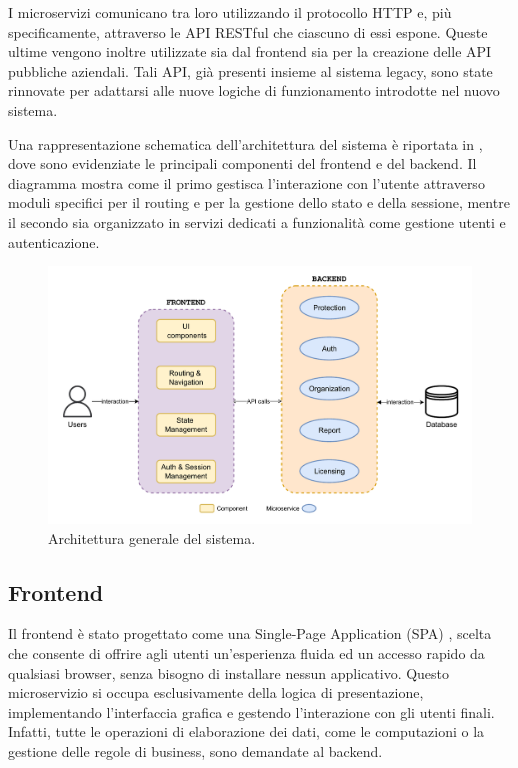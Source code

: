 I microservizi comunicano tra loro utilizzando il protocollo HTTP e, più specificamente, attraverso le API RESTful che ciascuno di essi espone. Queste ultime vengono inoltre utilizzate sia dal frontend sia per la creazione delle API pubbliche aziendali. Tali API, già presenti insieme al sistema legacy, sono state rinnovate per adattarsi alle nuove logiche di funzionamento introdotte nel nuovo sistema.

Una rappresentazione schematica dell'architettura del sistema è riportata in , dove sono evidenziate le principali componenti del frontend e del backend. Il diagramma mostra come il primo gestisca l'interazione con l'utente attraverso moduli specifici per il routing e per la gestione dello stato e della sessione, mentre il secondo sia organizzato in servizi dedicati a funzionalità come gestione utenti e autenticazione.

\begin{figure}
  \centering
  \includegraphics[width=1\textwidth]{figures/system-architecture.pdf}
  \caption{Architettura generale del sistema.}
  \label{fig:system-architecture}
\end{figure}

\subsection{Frontend}
Il frontend è stato progettato come una Single-Page Application (SPA) \cite{Fink2014}, scelta che consente di offrire agli utenti un'esperienza fluida ed un accesso rapido da qualsiasi browser, senza bisogno di installare nessun applicativo. Questo microservizio si occupa esclusivamente della logica di presentazione, implementando l'interfaccia grafica e gestendo l'interazione con gli utenti finali. Infatti, tutte le operazioni di elaborazione dei dati, come le computazioni o la gestione delle regole di business, sono demandate al backend.

